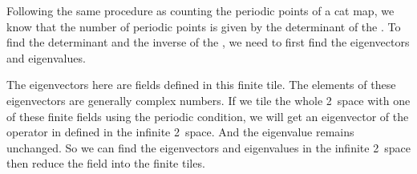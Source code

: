 Following the same procedure as counting the periodic points of a cat
map, we know that the number of periodic points is given by the
determinant of the {\jacobianOrb}. To find the determinant and the
inverse of the {\jacobianOrb}, we need to first find the eigenvectors
and eigenvalues.

The eigenvectors here are fields defined in this finite tile. The
elements of these eigenvectors are generally complex numbers. If we tile
the whole 2\dmn\ space with one of these finite fields using the periodic
condition, we will get an eigenvector of the operator in 
defined in the infinite 2\dmn\ space. And the eigenvalue remains
unchanged. So we can find the eigenvectors and eigenvalues in the
infinite 2\dmn\ space then reduce the field into the finite tiles.


